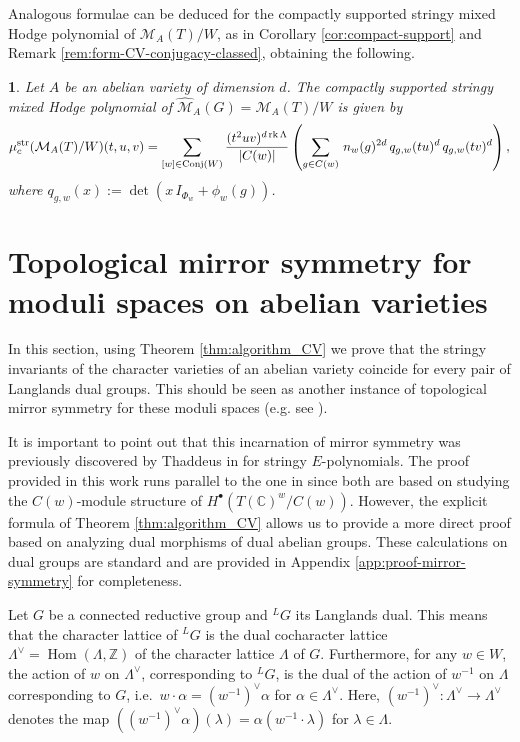 \documentclass[11pt,english]{amsart}
\numberwithin{equation}{section}
\numberwithin{figure}{section}
\theoremstyle{plain}
\newtheorem{thm}{\protect\theoremname}[section]
\theoremstyle{plain}
\theoremstyle{definition}
\theoremstyle{remark}
\newcommand{\ZZ}{\mathbb{Z}}
\newcommand{\CC}{\mathbb{C}}
\newcommand{\Hom}{\operatorname{Hom}}
\newcommand{\rk}{\operatorname{rk}}
\newcommand{\str}{\textup{str}}
\providecommand{\theoremname}{Theorem}
\begin{document}
Analogous formulae can be deduced for the compactly supported stringy mixed Hodge polynomial of $\mathcal{M}_A(T) / W$, as in Corollary \ref{cor:compact-support} and Remark \ref{rem:form-CV-conjugacy-classed}, obtaining the following.

\begin{thm}\label{thm:algorithm_Higgs_compact}
    Let $A$ be an abelian variety of dimension $d$. The compactly supported stringy mixed Hodge polynomial of $\hat{\mathcal{M}}_A(G) = \mathcal{M}_A(T) / W$ is given by
\[
        \mu_c^{\str} (\mathcal{M}_A(T) / W)(t,u,v) 
        =\sum_{[w] \in \textup{Conj}(W)}
        \frac{(t^{2}uv)^{d\rk\Lambda }}{|C(w)|}\left(\sum_{g \in C(w)} \, n_{w}(g)^{2d}\, q_{g,w}(tu)^d\, q_{g,w}(tv)^d \right),
\]
where $q_{g,w}(x):=\det (x\, I_{\Phi_w} + \phi_w(g))$.
\end{thm}



\section[mirror]{Topological mirror symmetry for moduli spaces on abelian varieties}\label{sec:topological-mirror-symmetry}

In this section, using Theorem \ref{thm:algorithm_CV} we prove that the stringy invariants of the character varieties of an abelian variety coincide for every pair of Langlands dual groups. This should be seen as another instance of topological mirror symmetry for these moduli spaces (e.g. see \cite{FlorentinoNozadZamora2021}).

It is important to point out that this incarnation of mirror symmetry was previously discovered by Thaddeus in \cite{Th} for stringy $E$-polynomials. The proof provided in this work runs parallel to the one in \cite{Th} since both are based on studying the $C(w)$-module structure of $H^\bullet(T(\CC)^w/C(w))$. However, the explicit formula of Theorem \ref{thm:algorithm_CV} allows us to provide a more direct proof based on analyzing dual morphisms of dual abelian groups. These calculations on dual groups are standard and are provided in Appendix \ref{app:proof-mirror-symmetry} for completeness.

Let $G$ be a connected reductive group and $^LG$ its Langlands dual. This means that the character lattice of $^LG$ is the dual cocharacter lattice $\Lambda^\vee = \Hom(\Lambda, \ZZ)$ of the character lattice $\Lambda$ of $G$. Furthermore, for any $w \in W$, the action of $w$ on $\Lambda^\vee$, corresponding to $^LG$, is the dual of the action of $w^{-1}$ on $\Lambda$ corresponding to $G$, i.e.\ $w \cdot \alpha = (w^{-1})^\vee \alpha$ for $\alpha \in \Lambda^\vee$. Here, $(w^{-1})^\vee: \Lambda^\vee \to \Lambda^\vee$ denotes the map $((w^{-1})^\vee \alpha)(\lambda) =  \alpha(w^{-1} \cdot \lambda)$ for $\lambda \in \Lambda$.
\end{document}
